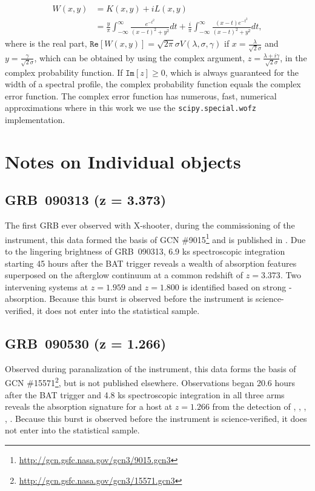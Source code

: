 \documentclass{aa}    %
\begin{document}
\begin{equation} 
\begin{split}
W(x, y)  
& = K(x, y) + i L(x, y) \\
& = \frac{y}{\pi}  \int_{-\infty}^{\infty} \frac{e^{- t^2 }}{(x -  t)^2 +y^2} dt  + \frac{i}{\pi}  \int_{-\infty}^{\infty} \frac{(x - t)e^{- t^2 }}{(x -  t)^2 +y^2} dt,
\end{split}
\end{equation}
where is the real part, $\mathtt{Re}[W(x, y)] =  \sqrt{2 \pi} \sigma V(\lambda,\sigma, \gamma)$ if $x = \frac{\lambda}{\sqrt{2} \sigma}$ and $y = \frac{\gamma}{\sqrt{2} \sigma}$, which can be obtained by using the complex argument, $z = \frac{\lambda + i\gamma}{\sqrt{2} \sigma}$, in the complex probability function. If $\mathtt{Im}[z] \geq 0$, which is always guaranteed for the width of a spectral profile, the complex probability function equals the complex error function. The complex error function has numerous, fast, numerical approximations where in this work we use the \texttt{scipy.special.wofz} \citep{scipy} implementation.


\section{Notes on Individual objects} \label{notes}

\subsection{GRB~090313 (z = 3.373)}
The first GRB ever observed with X-shooter, during the commissioning of the
instrument, this data formed the basis of GCN
\#9015\footnote{\url{http://gcn.gsfc.nasa.gov/gcn3/9015.gcn3}} and is published
in \citet{DeUgartePostigo2010}. Due to the lingering brightness of GRB~090313,
6.9 ks spectroscopic integration starting 45 hours after the BAT trigger reveals
a wealth of absorption features superposed on the afterglow continuum at a
common redshift of $z = 3.373$. Two intervening systems at $z = 1.959$ and $z =
1.800$ is identified based on strong \mgii-absorption. Because this burst is
observed before the instrument is science-verified, it does not enter into the
statistical sample.

\subsection{GRB~090530 (z = 1.266)}
Observed during paranalization of the instrument, this data forms the basis of
GCN \#15571\footnote{\url{http://gcn.gsfc.nasa.gov/gcn3/15571.gcn3}}, but is not
published elsewhere. Observations began 20.6 hours after the BAT trigger and 4.8
ks spectroscopic integration in all three arms reveals the absorption signature
for a host at $z = 1.266$ from the detection of \mgii, \mgi, \SIii, \feii,
\aliii. Because this burst is observed before the instrument is
science-verified, it does not enter into the statistical sample.
\end{document}
